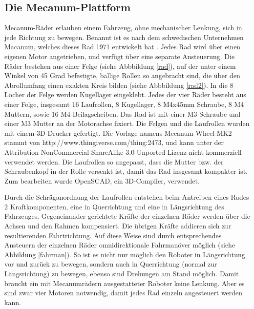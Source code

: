 \documentclass[a4paper,bibtotoc,oneside]{scrbook}
\begin{document}
\subsection{Die Mecanum-Plattform}\thispagestyle{empty}
Mecanum-Räder erlauben einem Fahrzeug, ohne mechanischer Lenkung, sich in jede Richtung zu bewegen. Benannt ist es nach dem schwedischen Unternehmen Macanum, welches dieses Rad 1971 entwickelt hat \cite{mecanum}. 
Jedes Rad wird über einen eigenen Motor angetrieben, und verfügt über eine separate Ansteuerung. Die Räder bestehen aus einer Felge (siehe Abbbildung \ref{rad}), auf der unter einem Winkel von 45 Grad befestigte, ballige Rollen so angebracht sind, die über den Abrollumfang einen exakten Kreis bilden (siehe Abbbildung \ref{rad2}). In die 8 Löcher der Felge werden Kugellager eingeklebt. Jedes der vier Räder besteht aus einer Felge, insgesamt 16 Laufrollen, 8 Kugellager, 8 M4x45mm Schraube, 8 M4 Muttern, sowie 16 M4 Beilagscheiben. 
Das Rad ist mit einer M3 Schraube und einer M3 Mutter an der Motorachse fixiert.
Die Felgen und die Laufrollen wurden mit einem 3D-Drucker gefertigt. 
Die Vorlage namens Mecanum Wheel MK2 stammt von http://www.thingiverse.com/thing:2473, und kann unter der Attribution-NonCommercial-ShareAlike 3.0 Unported Lizenz nicht kommerziell verwendet werden.
Die Laufrollen so angepasst, dass die Mutter bzw. der Schraubenkopf in der Rolle versenkt ist, damit das Rad insgesamt kompakter ist. Zum bearbeiten wurde OpenSCAD, ein 3D-Compiler, verwendet. 

Durch die Schräganordnung der Laufrollen entstehen beim Antreiben eines Rades 2 Kraftkomponenten, eine in Querrichtung und eine in Längsrichtung des Fahrzeuges. Gegeneinander gerichtete Kräfte der einzelnen Räder werden über die Achsen und den Rahmen kompensiert. Die übrigen Kräfte addieren sich zur resultierenden Fahrtrichtung. Auf diese Weise sind durch entsprechendes Ansteuern der einzelnen Räder omnidirektionale Fahrmanöver möglich (siehe Abbildung \ref{fahrman}). So ist es nicht nur möglich den Roboter in Längsrichtung vor und zurück zu bewegen, sondern auch in Querrichtung (normal zur Längsrichtung) zu bewegen, ebenso sind Drehungen am Stand möglich. Damit braucht ein mit Mecanumrädern ausgestatteter Roboter keine Lenkung. Aber es sind zwar vier Motoren notwendig, damit jedes Rad einzeln angesteuert werden kann.   
\end{document}
